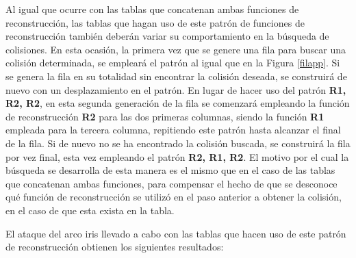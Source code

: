 \documentclass[12pt,spanish,listoffigures,listoftables,listofalgorithms]{tfgetsinf}
\begin{document}
Al igual que ocurre con las tablas que concatenan ambas funciones de reconstrucción, las tablas que hagan uso de este patrón de funciones de reconstrucción también deberán variar su comportamiento en la búsqueda de colisiones. En esta ocasión, la primera vez que se genere una fila para buscar una colisión determinada, se empleará el patrón al igual que en la Figura \ref{filapp}. Si se genera la fila en su totalidad sin encontrar la colisión deseada, se construirá de nuevo con un desplazamiento en el patrón. En lugar de hacer uso del patrón \textbf{R1, R2, R2}, en esta segunda generación de la fila se comenzará empleando la función de reconstrucción \textbf{R2} para las dos primeras columnas, siendo la función \textbf{R1} empleada para la tercera columna, repitiendo este patrón hasta alcanzar el final de la fila. Si de nuevo no se ha encontrado la colisión buscada, se construirá la fila por vez final, esta vez empleando el patrón \textbf{R2, R1, R2}. El motivo por el cual la búsqueda se desarrolla de esta manera es el mismo que en el caso de las tablas que concatenan ambas funciones, para compensar el hecho de que se desconoce qué función de reconstrucción se utilizó en el paso anterior a obtener la colisión, en el caso de que esta exista en la tabla.

El ataque del arco iris llevado a cabo con las tablas que hacen uso de este patrón de reconstrucción obtienen los siguientes resultados:
\end{document}
